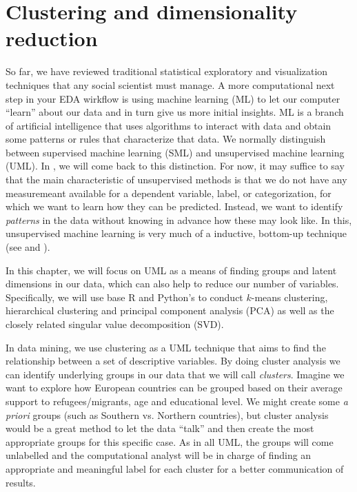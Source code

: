 \section{Clustering and dimensionality reduction}
\label{sec:clustering}

So far, we have reviewed traditional statistical exploratory and
visualization techniques that any social scientist must manage. A more
computational next step in your EDA wirkflow is using machine learning
(ML) to let our computer ``learn'' about our data and in turn give us
more initial insights.  ML is a branch of artificial intelligence that
uses algorithms to interact with data and obtain some patterns or
rules that characterize that data. We normally distinguish between
supervised machine learning (SML) and unsupervised machine learning
(UML). In , we will come back to this distinction.
For now, it may suffice to say that the main characteristic of
unsupervised methods is that we do not have any measuremeant available
for a dependent variable, label, or categorization, for which we want
to learn how they can be predicted. Instead, we want to identify
\emph{patterns} in the data without knowing in advance how these may
look like. In this, unsupervised machine learning is very much of a
inductive, bottom-up technique (see  and
\cite{Boumans2016}).

In this chapter, we will focus on UML as a means of finding groups and
latent dimensions in our data, which can also help to reduce our
number of variables. Specifically, we will use base R and Python's
 to conduct $k$-means clustering, hierarchical
clustering and principal component analysis (PCA) as well as the
closely related singular value decomposition (SVD).

In data mining, we use clustering as a UML technique that aims to find
the relationship between a set of descriptive variables. By doing
cluster analysis we can identify underlying groups in our data that we
will call \textit{clusters}. Imagine we want to explore how European
countries can be grouped based on their average support to
refugees/migrants, age and educational level. We might create some
\textit{a priori} groups (such as Southern vs. Northern countries),
but cluster analysis would be a great method to let the data ``talk''
and then create the most appropriate groups for this specific case. As
in all UML, the groups will come unlabelled and the computational
analyst will be in charge of finding an appropriate and meaningful
label for each cluster for a better communication of results. 

